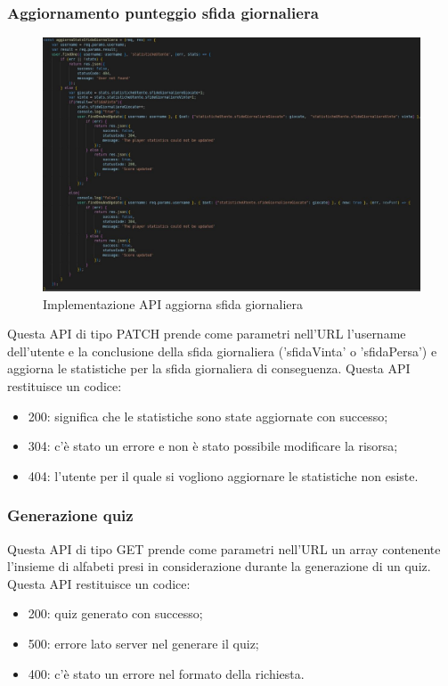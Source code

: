 \subsubsection{Aggiornamento punteggio sfida giornaliera}
\begin{figure}[!h]
\centering
\includegraphics[scale=0.4]{images/api_aggiorna_stats_sfida_giornaliera.jpg}
\caption{Implementazione API aggiorna sfida giornaliera}
\label{fig:api_aggiorna_stats_sfida_giornaliera}
\end{figure}
\noindent
Questa API di tipo PATCH prende come parametri nell'URL l'username dell'utente e la conclusione della sfida giornaliera ('sfidaVinta' o 'sfidaPersa') e aggiorna le statistiche per la sfida giornaliera di conseguenza.
Questa API restituisce un codice:
\begin{itemize}
    \item 200: significa che le statistiche sono state aggiornate con successo;
    \item 304: c'è stato un errore e non è stato possibile modificare la risorsa;
    \item 404: l'utente per il quale si vogliono aggiornare le statistiche non esiste.
\end{itemize}

\subsubsection{Generazione quiz}
Questa API di tipo GET prende come parametri nell'URL un array contenente l'insieme di alfabeti presi in considerazione durante la generazione di un quiz.
Questa API restituisce un codice:
\begin{itemize}
    \item 200: quiz generato con successo;
    \item 500: errore lato server nel generare il quiz;
    \item 400: c'è stato un errore nel formato della richiesta.
\end{itemize}

